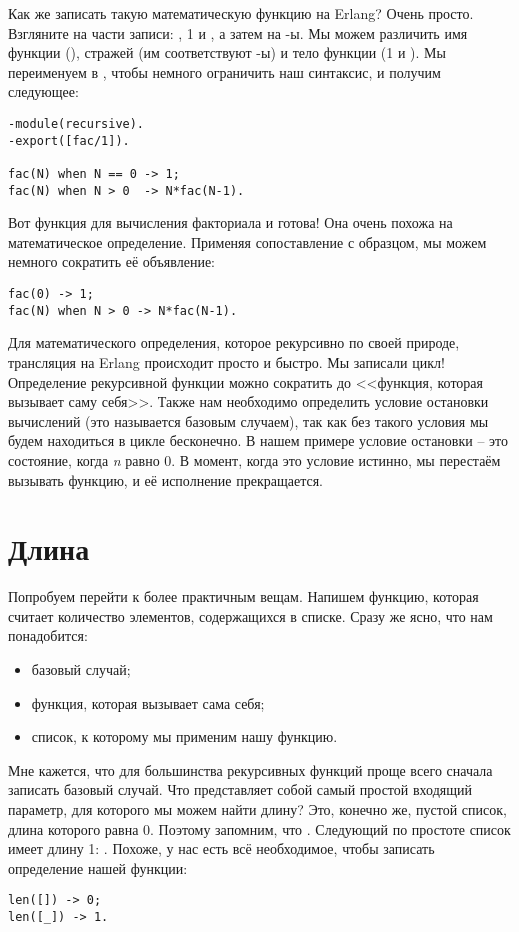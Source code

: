 Как же записать такую математическую функцию на Erlang? Очень просто. Взгляните на части записи: , 1 и , а затем на \--ы. Мы можем различить имя функции (), стражей (им соответствуют \--ы) и тело функции (1 и ). Мы переименуем  в , чтобы немного ограничить наш синтаксис, и получим следующее:
\begin{lstlisting}[style=erlang]
-module(recursive).
-export([fac/1]).
 
fac(N) when N == 0 -> 1;
fac(N) when N > 0  -> N*fac(N-1).
\end{lstlisting}

Вот функция для вычисления факториала и готова! Она очень похожа на математическое определение. Применяя сопоставление с образцом, мы можем немного сократить её объявление:
\begin{lstlisting}[style=erlang]
fac(0) -> 1;
fac(N) when N > 0 -> N*fac(N-1).
\end{lstlisting}

Для математического определения, которое рекурсивно по своей природе, трансляция на Erlang происходит просто и быстро. Мы записали цикл! Определение рекурсивной функции можно сократить до <<функция, которая вызывает саму себя>>. Также нам необходимо определить условие остановки вычислений (это называется базовым случаем), так как без такого условия мы будем находиться в цикле бесконечно. В нашем примере условие остановки \--- это состояние, когда \emph{n} равно 0. В момент, когда это условие истинно, мы перестаём вызывать функцию, и её исполнение прекращается. 
\section{Длина}
\label{length}
Попробуем перейти к более практичным вещам. Напишем функцию, которая считает количество элементов, содержащихся в списке. Сразу же ясно, что нам понадобится:\\
\begin{itemize}
\item базовый случай;
\item функция, которая вызывает сама себя;
\item список, к которому мы применим нашу функцию.
\end{itemize}

Мне кажется, что для большинства рекурсивных функций проще всего сначала записать базовый случай. Что представляет собой самый простой входящий параметр, для которого мы можем найти длину? Это, конечно же, пустой список, длина которого равна 0. Поэтому запомним, что . Следующий по простоте список имеет длину 1: . Похоже, у нас есть всё необходимое, чтобы записать определение нашей функции:
\begin{lstlisting}[style=erlang]
len([]) -> 0;
len([_]) -> 1.
\end{lstlisting}

